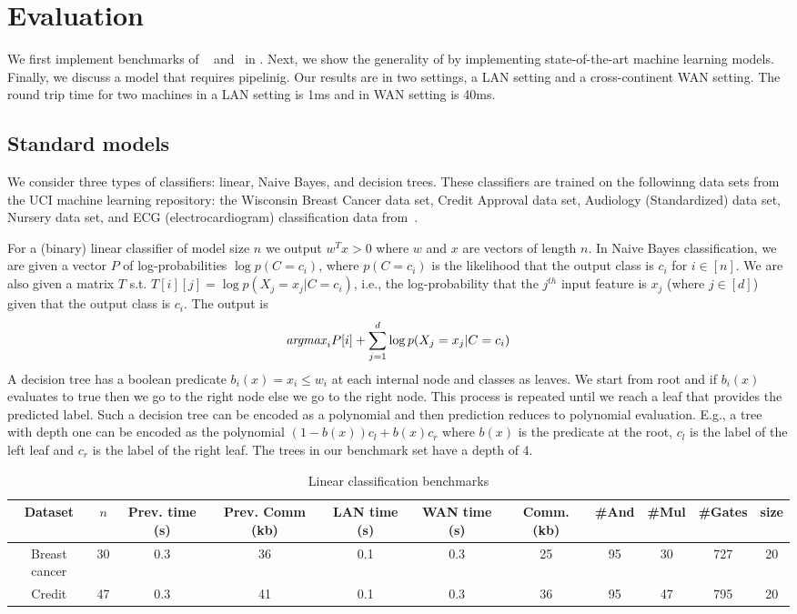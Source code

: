 \section{Evaluation}
\label{sec:eval}

We first implement benchmarks of ~\cite{shafindss} and~\cite{minionn} in \tool.
Next, we show the generality of \tool by implementing state-of-the-art machine learning models.
Finally, we discuss a model that requires pipelinig.
Our results are in two settings, a LAN setting and a cross-continent WAN setting.
The round trip time for two machines in a LAN setting is 1ms and in WAN setting is 40ms.

\subsection{Standard models}
\label{sec:shallow}
We consider three types of classifiers: linear, Naive Bayes, and decision trees. 
These classifiers are trained on the followinng data sets from the UCI  machine learning repository:
 the Wisconsin Breast Cancer data set, 
Credit Approval data set, Audiology (Standardized) data set, Nursery data set, and
ECG (electrocardiogram) classification data from~\cite{barni}.

For a  (binary) linear classifier of model size $n$ we output $w^Tx>0$ where $w$ and $x$ are vectors
of length $n$. In Naive Bayes classification, we are given a vector $P$ of log-probabilities
$\log p(C=c_i)$, where $p(C=c_i)$ is the likelihood that the output class is $c_i$ for $i\in[n]$. 
We are also given a matrix $T$ s.t. $T[i][j]=\log p(X_j=x_j|C=c_i)$, i.e., the log-probability that 
the $j^{th}$ input feature is $x_j$ (where $j\in [d]$) given that the output class is $c_i$. The output is
\[
{\it argmax}_i P[i]+\sum_{j=1}^d\log p(X_j=x_j|C=c_i)
\]
A decision tree has a boolean predicate $b_i(x) = x_i\leq w_i$ at each internal node and classes as leaves.
We start from root and if $b_i(x)$ evaluates to true then we go to the right node else
we go to the right node. This process is repeated until we reach a leaf that provides
the predicted label. Such a decision tree can be encoded as a polynomial and then prediction
reduces to polynomial evaluation. E.g., a tree with depth one can be encoded as the polynomial
$(1-b(x))c_l + b(x)c_r$ where $b(x)$ is the predicate at the root, $c_l$ is the label of the left leaf
and $c_r$ is the label of the right leaf. The trees in our benchmark set have a depth of 4.

\begin{table*}
\begin{tabular}{c|c|c|c|c |c|c|c|c|c|c}
Dataset & $n$  & Prev. time (s) & Prev. Comm (kb) & LAN time (s) & WAN time (s) & Comm. (kb)  & \#And & \#Mul & \#Gates & size\\
\hline
Breast cancer & 30 & 0.3 & 36 & 0.1 & 0.3 & 25 & 95 & 30 & 727 & 20\\
\hline
Credit & 47 & 0.3 & 41 & 0.1 & 0.3 & 36 & 95 & 47 & 795 & 20\\
\hline
\end{tabular}

 \caption{Linear classification benchmarks}
 \label{tab:lc} 
\end{table*}

